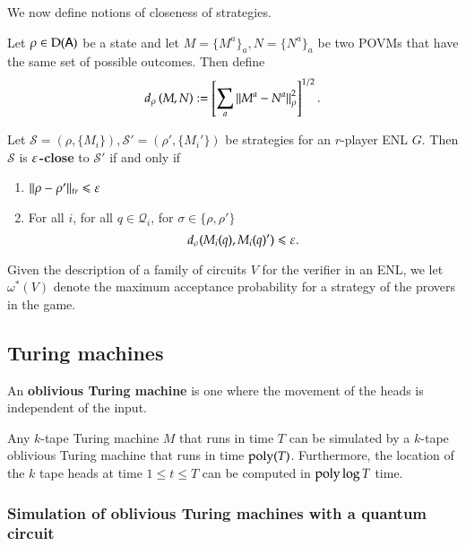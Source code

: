 We now define notions of closeness of strategies. 

\begin{definition}
	Let $\rho \in \mathrm{D}({\mathsf{A}})$ be a state and let $M = \{M^a\}_a,N = \{N^a\}_a$ be two POVMs that have the same set of possible outcomes. Then define 
	\begin{align}
		d_\rho \left( M, N \right) := \left[ \sum_a \left\lVert M^a - N^a \right\rVert_\rho^2 \right]^{1/2}.
	\end{align}
\end{definition}


\begin{definition}
	Let $\mathcal{S} = (\rho,\{M_i\}), \mathcal{S}' = (\rho',\{M_i'\})$ be strategies for an $r$-player ENL $G$. Then $\mathcal{S}$ is \textbf{$\varepsilon$-close} to $\mathcal{S}'$ if and only if
	\begin{enumerate}
		\item $ \lVert \rho - \rho'\rVert_{tr} \leqslant \varepsilon$
		\item For all $i$, for all $q \in \mathcal{Q}_i$, for $\sigma \in \{\rho,\rho'\}$
		\[
		d_\sigma(M_i(q),M_i(q)') \leqslant \varepsilon.
		\]
	\end{enumerate}
\end{definition}

\begin{definition}
Given the description of a family of circuits $V$ for the verifier in an ENL, we let $\omega^*(V)$ denote the maximum acceptance probability for a strategy of the provers in the game. 
\end{definition}


\subsection{Turing machines}
\label{sec:turing_machines}

An \textbf{oblivious Turing machine} is one where the movement of the heads is independent of the input.

\begin{theorem}\label{thm:pippenger}
Any $k$-tape Turing machine $M$ that runs in time $T$ can be simulated by a $k$-tape oblivious Turing machine that runs in time $\operatorname{poly}(T)$. Furthermore, the location of the $k$ tape heads at time $1 \leq t \leq T$ can be computed in $\operatorname{poly} \log T$ time.
\end{theorem}


\subsubsection{Simulation of oblivious Turing machines with a quantum circuit}

